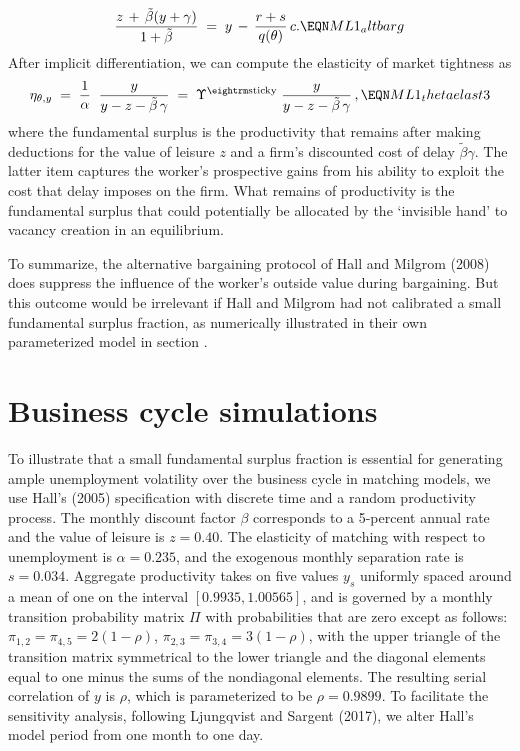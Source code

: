 $$
{ z\,+\,\tilde \beta(y+\gamma) \over 1+\tilde \beta }  \;=\;
y \,-\, {r + s \over q(\theta)} \, c .       \EQN ML1_altbarg
$$
After implicit differentiation,
we can compute the elasticity of market tightness as
$$
\eta_{\theta,y}
\;=\; {1 \over \alpha} \; \;
      {y \over y-z- \tilde \beta \,\gamma}
\;=\; \Upsilon^{\rm sticky}\;
         {y \over y-z- \tilde \beta \,\gamma}\,,  \EQN ML1_thetaelast3
$$
where the fundamental surplus is the productivity
that remains after making deductions for the value of leisure $z$
and a firm's discounted cost of delay $\tilde \beta \gamma$.
The latter item
captures the worker's prospective gains from his
 ability to exploit the
cost that delay imposes on the firm.  What remains of productivity is the
fundamental surplus that could potentially be allocated by the
`invisible hand'  to  vacancy creation in an equilibrium.

To summarize, the alternative bargaining
protocol of Hall and Milgrom (2008) does suppress the influence of the
worker's outside value during bargaining. But
this outcome would be irrelevant if  Hall and Milgrom had  not
calibrated a small fundamental surplus fraction, as numerically
illustrated in their own parameterized model in section
.







\section{Business cycle simulations}\label{sec:FS_simulations}%
%
To illustrate that a small fundamental surplus fraction is essential for
generating ample unemployment volatility over the business cycle in
matching models, we use  Hall's (2005) specification
with discrete time and a  random productivity process.
The monthly discount factor $\beta$ corresponds to a 5-percent annual
rate and the value of leisure is $z=0.40$. The elasticity of
matching with respect to unemployment is $\alpha=0.235$, and the
exogenous monthly separation rate is $s=0.034$. Aggregate productivity
takes on five  values $y_s$ uniformly spaced around a mean of
one on the interval $[0.9935, 1.00565]$, and is governed by
a monthly transition probability matrix $\Pi$ with probabilities
that are zero except as follows: $\pi_{1,2}=\pi_{4,5}=2(1-\rho)$,
$\pi_{2,3}=\pi_{3,4}=3(1-\rho)$, with the upper triangle of the
transition matrix symmetrical to the lower triangle and the
diagonal elements equal to one minus the sums of the nondiagonal
elements. The resulting serial correlation of $y$ is $\rho$, which
is parameterized to be $\rho=0.9899$.
To facilitate the
sensitivity analysis, following Ljungqvist and Sargent (2017), we alter
Hall's model period from one month to one day.




